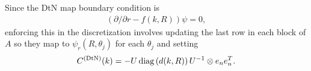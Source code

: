 Since the DtN map boundary condition is 
\begin{align*}
 \left(\partial/\partial r - f(k,R)\right)\psi = 0,
\end{align*}
enforcing this in the discretization involves updating
the last row in each block of $A$ so they map to
$\psi_r(R,\theta_j)$ for each $\theta_j$ and setting
\begin{align*}
 C^{(\text{DtN})}(k) = -U\operatorname{diag}\left(d(k,R)\right)U^{-1} \otimes e_ne_n^T.
\end{align*}


